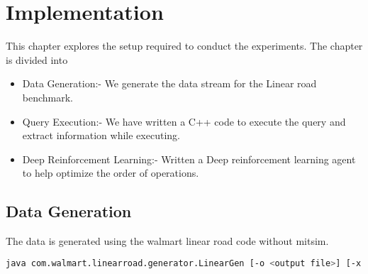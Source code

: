 \chapter{Implementation}
\label{chapter:implementation}
\thispagestyle{myheadings}

\graphicspath{}
This chapter explores the setup required to conduct the experiments. The chapter is divided into 
\begin{itemize}
\item Data Generation:- We generate the data stream for the Linear road benchmark.
\item Query Execution:- We have written a C++ code to execute the query and extract information while executing.
\item Deep Reinforcement Learning:- Written a Deep reinforcement learning agent to help optimize the order of operations.
\end{itemize}

\section{Data Generation}
The data is generated using the walmart linear road code \cite{walmart_linearoad} without mitsim.\\

\begin{lstlisting}[language=bash]
java com.walmart.linearroad.generator.LinearGen [-o <output file>] [-x <number of xways>] [-m <dummy value to activate multi-threading>]
\end{lstlisting}

